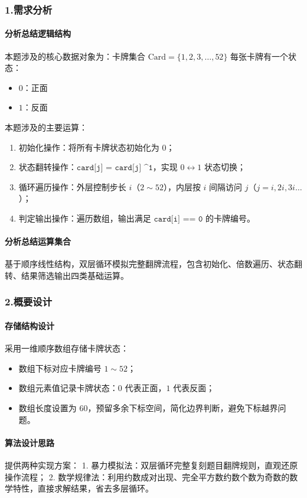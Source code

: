 \documentclass{ctexart}
\begin{document}
\subsubsection{1.需求分析}
\paragraph{分析总结逻辑结构}
本题涉及的核心数据对象为：卡牌集合 $\text{Card} = \{1, 2, 3, \dots, 52\}$
每张卡牌有一个状态：
\begin{itemize}
    \item $0$：正面
    \item $1$：反面
\end{itemize}
本题涉及的主要运算：
\begin{enumerate}
    \item 初始化操作：将所有卡牌状态初始化为 $0$；
    \item 状态翻转操作：$\texttt{card[j] = card[j] \textasciicircum 1}$，实现 $0 \leftrightarrow 1$ 状态切换；
    \item 循环遍历操作：外层控制步长 $i$（$2 \sim 52$），内层按 $i$ 间隔访问 $j$（$j = i,2i,3i\dots$）；
    \item 判定输出操作：遍历数组，输出满足 $\texttt{card[i] == 0}$ 的卡牌编号。
\end{enumerate}

\paragraph{分析总结运算集合}
基于顺序线性结构，双层循环模拟完整翻牌流程，包含初始化、倍数遍历、状态翻转、结果筛选输出四类基础运算。

\subsubsection{2.概要设计}
\paragraph{存储结构设计}
采用一维顺序数组存储卡牌状态：
\begin{itemize}
    \item 数组下标对应卡牌编号 $1 \sim 52$；
    \item 数组元素值记录卡牌状态：$0$ 代表正面，$1$ 代表反面；
    \item 数组长度设置为 $60$，预留多余下标空间，简化边界判断，避免下标越界问题。
\end{itemize}

\paragraph{算法设计思路}
提供两种实现方案：
1. 暴力模拟法：双层循环完整复刻题目翻牌规则，直观还原操作流程；
2. 数学规律法：利用约数成对出现、完全平方数约数个数为奇数的数学特性，直接求解结果，省去多层循环。
\end{document}
